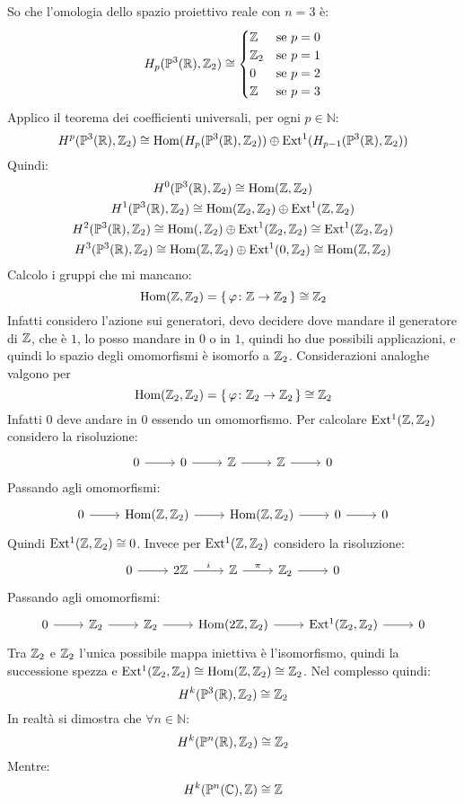 \begin{example}
  So che l'omologia dello spazio proiettivo reale con $ n = 3 $ è:
  \[
    H_p(\mathbb{P}^{3} (\mathbb{R}), \mathbb{Z}_2) \cong
    \begin{cases}
      \mathbb{Z} & \text{se } p = 0 \\
      \mathbb{Z}_2 & \text{se } p = 1 \\
      0 & \text{se } p = 2 \\
      \mathbb{Z} & \text{se } p = 3
    \end{cases}
  \]
  Applico il teorema dei coefficienti universali, per ogni $ p \in \mathbb{N} $:
  \[
    H^p(\mathbb{P}^{3} (\mathbb{R}), \mathbb{Z}_2) \cong \mathrm{Hom}( H_p(\mathbb{P}^{3} (\mathbb{R}), \mathbb{Z}_2)) \oplus \mathrm{Ext^1}( H_{p-1}(\mathbb{P}^{3} (\mathbb{R}), \mathbb{Z}_2))
  \]
  Quindi:
  \begin{gather*}
    H^0(\mathbb{P}^{3} (\mathbb{R}), \mathbb{Z}_2) \cong \mathrm{Hom}( \mathbb{Z}, \mathbb{Z}_2) \\
    H^1(\mathbb{P}^{3} (\mathbb{R}), \mathbb{Z}_2) \cong \mathrm{Hom}( \mathbb{Z}_2, \mathbb{Z}_2) \oplus \mathrm{Ext^1}( \mathbb{Z}, \mathbb{Z}_2) \\
    H^2(\mathbb{P}^{3} (\mathbb{R}), \mathbb{Z}_2) \cong \mathrm{Hom}( , \mathbb{Z}_2) \oplus \mathrm{Ext^1}( \mathbb{Z}_2, \mathbb{Z}_2) \cong \mathrm{Ext^1}( \mathbb{Z}_2, \mathbb{Z}_2) \\
    H^3(\mathbb{P}^{3} (\mathbb{R}), \mathbb{Z}_2) \cong \mathrm{Hom}( \mathbb{Z}, \mathbb{Z}_2) \oplus \mathrm{Ext^1}( 0, \mathbb{Z}_2) \cong \mathrm{Hom}( \mathbb{Z}, \mathbb{Z}_2)
  \end{gather*}
  Calcolo i gruppi che mi mancano:
  \[
    \mathrm{Hom}( \mathbb{Z}, \mathbb{Z}_2) = \set{\varphi\colon \mathbb{Z}\to \mathbb{Z}_2 } \cong \mathbb{Z}_2
  \]
  Infatti considero l'azione sui generatori, devo decidere dove mandare il generatore di $ \mathbb{Z} $,
  che è $ 1 $, lo posso mandare in $ 0 $ o in $ 1 $, quindi ho due possibili applicazioni, e quindi
  lo spazio degli omomorfismi è isomorfo a $ \mathbb{Z}_2 $. Considerazioni analoghe valgono per
  \[
    \mathrm{Hom}( \mathbb{Z}_2, \mathbb{Z}_2) = \set{\varphi\colon \mathbb{Z}_2 \to \mathbb{Z}_2 } \cong \mathbb{Z}_2
  \]
  Infatti $ 0 $ deve andare in $ 0 $ essendo un omomorfismo.
  Per calcolare $ \mathrm{Ext^1}( \mathbb{Z}, \mathbb{Z}_2) $ considero la risoluzione:
  \[
    \begin{tikzcd}
      0 \rar & 0 \rar & \Z \rar & \Z \rar & 0
    \end{tikzcd}
  \]
  Passando agli omomorfismi:
  \[
    \begin{tikzcd}
      0 \rar & \hom{\Z, \Z_2} \rar & \hom{\Z, \Z_2} \rar & 0 \rar & 0
    \end{tikzcd}
  \]
  Quindi $ \mathrm{Ext^1}( \mathbb{Z}, \mathbb{Z}_2) \cong 0 $.
  Invece per $ \mathrm{Ext^1}( \mathbb{Z}, \mathbb{Z}_2) $ considero la risoluzione:
  \[
    \begin{tikzcd}
      0 \rar & 2 \Z \rar{i} & \Z \rar{\pi} & \Z_2 \rar & 0
    \end{tikzcd}
  \]
  Passando agli omomorfismi:
  \[
    \begin{tikzcd}
      0 \rar & \Z_2 \rar & \Z_2 \rar & \hom{2\Z, \Z_2} \rar & \ext{\Z_2, \Z_2} \rar & 0
    \end{tikzcd}
  \]
  Tra $ \mathbb{Z}_2 $ e $ \mathbb{Z}_2 $ l'unica possibile mappa iniettiva è l'isomorfismo, quindi
  la successione spezza e $ \mathrm{Ext^1}( \mathbb{Z}_2, \mathbb{Z}_2) \cong \mathrm{Hom}( \mathbb{Z}, \mathbb{Z}_2) \cong \mathbb{Z}_2 $.
  Nel complesso quindi:
  \[
    H^k(\mathbb{P}^{3} (\mathbb{R}), \mathbb{Z}_2) \cong \mathbb{Z}_2
  \]
  In realtà si dimostra che $ \forall n \in \mathbb{N} $:
  \[
    H^k(\mathbb{P}^{n} (\mathbb{R}), \mathbb{Z}_2) \cong \mathbb{Z}_2
  \]
  Mentre:
  \[
    H^k(\mathbb{P}^{n} (\mathbb{C}), \mathbb{Z}) \cong \mathbb{Z}
  \]
\end{example}


